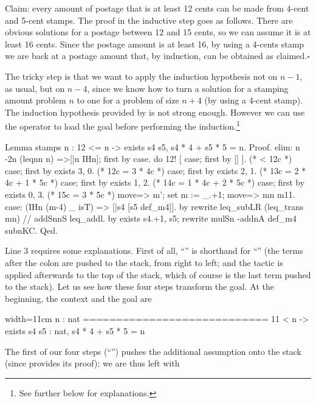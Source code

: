 Claim: every amount of postage that is at least 12 cents
can be made from 4-cent and 5-cent stamps.  The proof in the inductive
step goes as follows.  There are obvious solutions for a postage between
12 and 15 cents, so we can assume it is at least 16 cents.  Since
the postage amount is at least 16, by using a 4-cents stamp we are back
at a postage amount that, by induction, can be obtained as claimed.\hfill$\square$

The tricky step is that we want to apply the induction hypothesis not
on $n-1$, as usual, but on $n-4$, since we know how to turn a
solution for a stamping amount problem $n$ to one for a problem of
size $n+4$ (by using a 4-cent stamp).
The induction hypothesis provided by 
is not strong enough.  However we can use the \C{:} operator
to load the goal before performing the induction.\footnote{See further
below for explanations.}

\begin{coq}{}{}
Lemma stamps n : 12 <= n -> exists s4 s5, s4 * 4 + s5 * 5 = n.
Proof.
elim: n {-2}n (leqnn n) =>[|n IHn]; first by case.
do 12! [ case; first by [] ]. (* < 12c *)
case; first by exists 3, 0.   (* 12c = 3 * 4c *)
case; first by exists 2, 1.   (* 13c = 2 * 4c + 1 * 5c *)
case; first by exists 1, 2.   (* 14c = 1 * 4c + 2 * 5c *)
case; first by exists 0, 3.   (* 15c = 3 * 5c *)
move=> m'; set m := _.+1; move=> mn m11.
case: (IHn (m-4) _ isT) => [|s4 [s5 def_m4]].
  by rewrite leq_subLR (leq_trans mn) // addSnnS leq_addl.
by exists s4.+1, s5; rewrite mulSn -addnA def_m4 subnKC.
Qed.
\end{coq}

Line 3 requires some explanations. First of all,
``'' is shorthand for
``'' (the terms after the
colon \C{:} are pushed to the stack, from right to left; and the
 tactic is applied afterwards to the top of the stack, which
of course is the last term pushed to the stack). Let us see how these
four steps transform the goal. At the beginning, the context and the
goal are

\begin{coqout}{}{width=11cm}
  n : nat
  ============================
  11 < n -> exists s4 s5 : nat, s4 * 4 + s5 * 5 = n
\end{coqout}

The first of our
four steps (``'') pushes the additional
assumption  onto the stack (since  provides
its proof); we are thus left with


